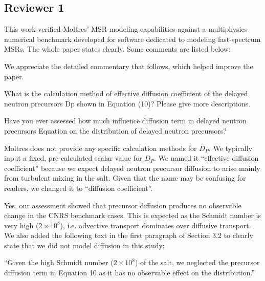 \documentclass[answers,11pt]{exam}
\begin{document}
\begin{questions}
\section*{Reviewer 1}

        \question This work verified Moltres' MSR modeling capabilities against
        a multiphysics numerical benchmark developed for software dedicated to
        modeling fast-spectrum MSRs. The whole paper states clearly. Some
        comments are listed below:
        
        \begin{solution}
            We appreciate the detailed commentary that follows, which helped
            improve the paper.
        \end{solution}

        \question What is the calculation method of effective diffusion
        coefficient of the delayed neutron precursors Dp shown in Equation
        (10)? Please give more descriptions.
        
        Have you ever assessed how much
        influence diffusion term in
        delayed neutron precursors Equation on the distribution of delayed
        neutron precursors?

        \begin{solution}
        	Moltres does not provide any specific calculation methods for
        	$D_P$. We typically input a fixed, pre-calculated scalar value
        	for $D_P$. We named it ``effective diffusion coefficient'' because
        	we expect delayed neutron precursor diffusion to arise mainly from
        	turbulent mixing in the salt. Given that the name may be confusing
        	for readers, we changed it to ``diffusion coefficient''.
        	
        	Yes, our assessment showed that precursor diffusion produces no
        	observable change in the CNRS benchmark cases. This is expected as
        	the Schmidt number is very high ($2\times10^8$), i.e. advective
        	transport dominates over diffusive transport. We also added the
        	following text in the first paragraph of Section 3.2 to clearly
        	state that we did not model diffusion in this study:
        	
        	``Given the high Schmidt number ($2\times10^8$)
\cite{tiberga_results_2020} of the salt, we neglected the precursor diffusion
term in Equation 10 as it has no observable effect on the distribution.''
        \end{solution}


\end{questions}
\end{document}
